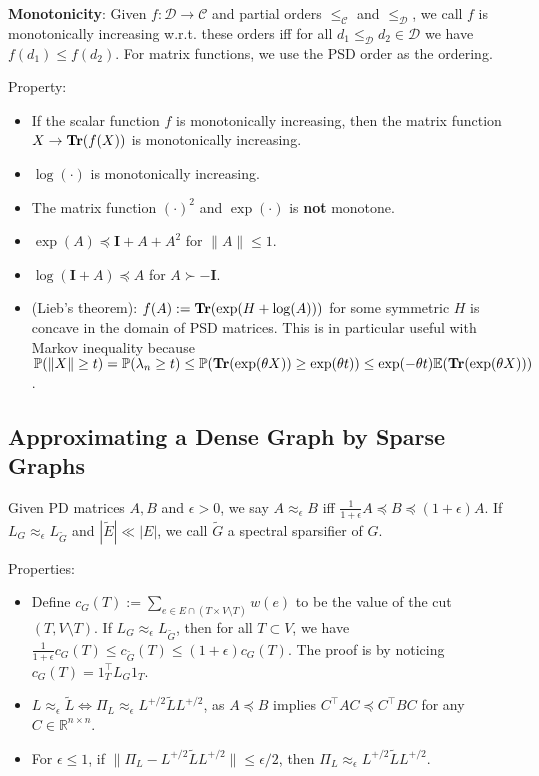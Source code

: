 \textbf{Monotonicity}: Given $f: \mathcal{D} \rightarrow \mathcal{C}$ and partial orders $\le_{\mathcal{C}}$ and $\le_{\mathcal{D}}$, we call $f$ is monotonically increasing w.r.t. these orders iff for all $d_1 \le_{\mathcal{D}} d_2 \in \mathcal{D}$ we have $f(d_1) \le f(d_2)$. For matrix functions, we use the PSD order as the ordering.

Property:
\begin{itemize}
    \item If the scalar function $f$ is monotonically increasing, then the matrix function $X \rightarrow \operatorname{\textbf{Tr}}(f(X))$ is monotonically increasing.
    \item $\log(\cdot)$ is monotonically increasing.
    \item The matrix function $(\cdot)^2$ and $\exp(\cdot)$ is \textbf{not} monotone.
    \item $\exp(A) \preceq \boldsymbol{I} + A + A^2$ for $\|A\| \le 1$.
    \item $\log(\boldsymbol{I}+A) \preceq A$ for $A \succ -\boldsymbol{I}$.
    \item (Lieb's theorem): $f(A):= \operatorname{\textbf{Tr}}(\exp(H+\log(A)))$ for some symmetric $H$ is concave in the domain of PSD matrices. This is in particular useful with Markov inequality because $\mathbb{P}(\|X\| \ge t) = \mathbb{P}(\lambda_n \ge t) \le \mathbb{P}(\operatorname{\textbf{Tr}}(\exp(\theta X)) \ge \exp(\theta t)) \le \exp(-\theta t)\mathbb{E}(\operatorname{\textbf{Tr}}(\exp(\theta X)))$.
\end{itemize}

\subsection{Approximating a Dense Graph by Sparse Graphs}

Given PD matrices $A, B$ and $\epsilon>0$, we say $A \approx_{\epsilon} B$ iff $\frac{1}{1+\epsilon} A \preceq B \preceq (1+\epsilon) A$. If $L_G \approx_{\epsilon} L_{\tilde{G}}$ and $|\tilde{E}| \ll |E|$, we call $\tilde{G}$ a spectral sparsifier of $G$.

Properties:
\begin{itemize}
    \item Define $c_G(T) := \sum_{e \in E \cap (T\times V\setminus T)} w(e)$ to be the value of the cut $(T, V\setminus T)$. If $L_G \approx_{\epsilon} L_{\tilde{G}}$, then for all $T \subset V$, we have $\frac{1}{1+\epsilon} c_G(T) \le c_{\tilde{G}}(T) \le (1+\epsilon) c_G(T)$. The proof is by noticing $c_G(T) = 1_T^\top L_G 1_T$.
    \item $L \approx_{\epsilon} \tilde{L} \Leftrightarrow \Pi_L \approx_\epsilon L^{+/2} \tilde{L} L^{+/2}$, as $A \preceq B$ implies $C^\top A C \preceq C^\top B C$ for any $C\in \mathbb{R}^{n\times n}$.
    \item For $\epsilon \le 1$, if $\|\Pi_L - L^{+/2} \tilde{L} L^{+/2}\| \le \epsilon/2$, then $\Pi_L \approx_\epsilon L^{+/2} \tilde{L} L^{+/2}$.
\end{itemize}

